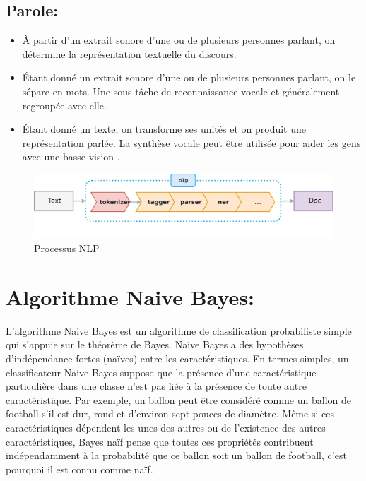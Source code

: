 \subsection{Parole:}
\begin{itemize}
    \item {}
          À partir d'un extrait sonore d'une ou de plusieurs personnes parlant, on détermine la représentation textuelle du discours.
    \item {}
          Étant donné un extrait sonore d'une ou de plusieurs personnes parlant, on le sépare en mots. Une sous-tâche de reconnaissance vocale et généralement regroupée avec elle.
    \item {}
          Étant donné un texte, on transforme ses unités et on produit une représentation parlée. La synthèse vocale peut être utilisée pour aider les gens avec une basse vision \cite{yi2011assistive}.
\end{itemize}

\begin{figure}
    \centering
    \includegraphics[width=\textwidth]{etude-theorique-conception/assets/nlp1.png}
    \caption{Processus NLP}
    \label{fig:nlpprocessus}
\end{figure}

\section{Algorithme Naive Bayes:}
L'algorithme Naive Bayes est un algorithme de classification probabiliste simple qui s'appuie sur le théorème de Bayes. Naive Bayes a des hypothèses d'indépendance fortes (naïves) entre les caractéristiques. En termes simples, un classificateur Naive Bayes suppose que la présence d'une caractéristique particulière dans une classe n'est pas liée à la présence de toute autre caractéristique. Par exemple, un ballon peut être considéré comme un ballon de football s'il est dur, rond et d'environ sept pouces de diamètre. Même si ces caractéristiques dépendent les unes des autres ou de l'existence des autres caractéristiques, Bayes naïf pense que toutes ces propriétés contribuent indépendamment à la probabilité que ce ballon soit un ballon de football, c'est pourquoi il est connu comme naïf.

